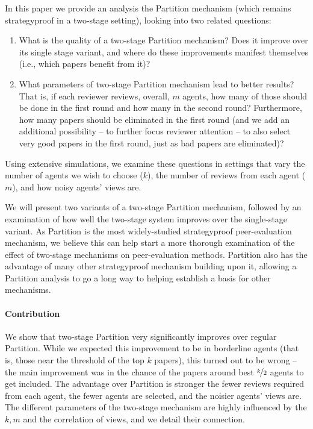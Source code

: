 \documentclass[letterpaper]{article} %
\begin{document}
In this paper we provide an analysis the Partition mechanism (which remains strategyproof in a two-stage setting), looking into two related questions:
\begin{enumerate}
\item What is the quality of a two-stage Partition mechanism? Does it improve over its single stage variant, and where do these improvements manifest themselves (i.e., which papers benefit from it)?
\item What parameters of two-stage Partition mechanism lead to better results? That is, if each reviewer reviews, overall, $m$ agents, how many of those should be done in the first round and how many in the second round? Furthermore, how many papers should be eliminated in the first round (and we add an additional possibility -- to further focus reviewer attention -- to also select very good papers in the first round, just as bad papers are eliminated)?
\end{enumerate}
Using extensive simulations, we examine these questions in settings that vary the number of agents we wish to choose ($k$), the number of reviews from each agent ($m$), and how noisy agents' views are.

We will present two variants of a two-stage Partition mechanism, followed by an examination of how well the two-stage system improves over the single-stage variant. As Partition is the most widely-studied strategyproof peer-evaluation mechanism, we believe this can help start a more thorough examination of the effect of two-stage mechanisms on peer-evaluation methods. Partition also has the advantage of many other strategyproof mechanism building upon it, allowing a Partition analysis to go a long way to helping establish a basis for other mechanisms.

\paragraph{Contribution} We show that two-stage Partition very significantly improves over regular Partition. While we expected this improvement to be in borderline agents (that is, those near the threshold of the top $k$ papers), this turned out to be wrong -- the main improvement was in the chance of the papers around best $\nicefrac{k}{2}$ agents to get included. The advantage over Partition is stronger the fewer reviews required from each agent, the fewer agents are selected, and the noisier agents' views are. The different parameters of the two-stage mechanism are highly influenced by the $k,m$ and the correlation of views, and we detail their connection.
\end{document}
